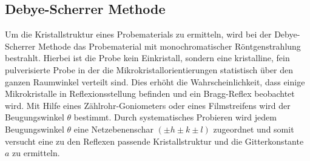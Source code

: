 \subsection{Debye-Scherrer Methode}
\label{subsec:Methoden}
Um die Kristallstruktur eines Probematerials
zu ermitteln, wird bei der Debye-Scherrer Methode
das Probematerial mit monochromatischer
Röntgenstrahlung bestrahlt.
Hierbei ist die Probe kein
Einkristall, sondern eine
kristalline, fein pulverisierte Probe
in der die Mikrokristallorientierungen statistisch
über den ganzen Raumwinkel verteilt sind.
Dies erhöht die Wahrscheinlichkeit, dass
einige Mikrokristalle in Reflexionsstellung
befinden und ein Bragg-Reflex beobachtet wird.
Mit Hilfe eines
Zählrohr-Goniometers oder
eines Filmstreifens wird der Beugungswinkel $\theta$
bestimmt. Durch systematisches Probieren wird
jedem Beugungswinkel $\theta$ eine Netzebenenschar
${(\pm h \pm k \pm l)}$ zugeordnet und somit versucht
eine zu den Reflexen passende Kristallstruktur und
die Gitterkonstante $a$
zu ermitteln.
